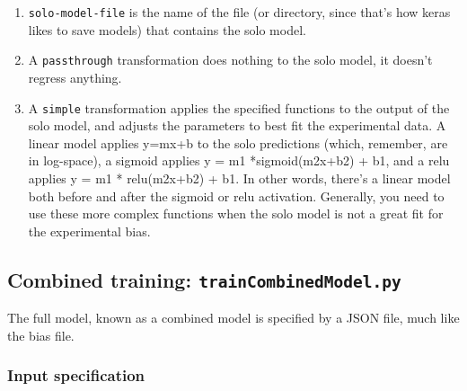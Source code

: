 \documentclass{article}
\begin{document}
\begin{enumerate}
    \item \texttt{solo-model-file} is the name of the file (or directory, since that's how keras likes to save models) that contains the solo model. 
    \item A \texttt{passthrough} transformation does nothing to the solo model, it doesn't regress anything. 
    \item A \texttt{simple} transformation applies the specified functions to the output of the solo model, and adjusts the parameters to best fit the experimental data. A linear model applies y=mx+b to the solo predictions (which, remember, are in log-space), a sigmoid applies y = m1 *sigmoid(m2x+b2) + b1, and a relu applies y = m1 * relu(m2x+b2) + b1. In other words, there's a linear model both before and after the sigmoid or relu activation. Generally, you need to use these more complex functions when the solo model is not a great fit for the experimental bias. 
\end{enumerate}



\newpage

\subsection{Combined training: \texttt{trainCombinedModel.py}}

The full model, known as a combined model is specified by a JSON file, much like the bias file.

\subsubsection{Input specification}
\end{document}
